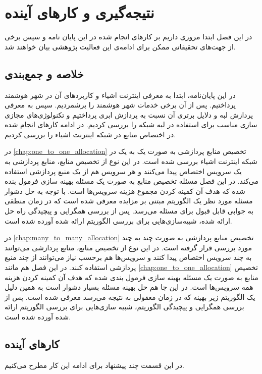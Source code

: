 \chapter{نتیجه‌گیری و کار‌های آینده}\label{chap:conclusion}
  در این فصل ابتدا مروری داریم بر کار‌های انجام شده در این پایان نامه و سپس برخی از جهت‌های تحقیقاتی ممکن برای ادامه‌ی این فعالیت پژوهشی بیان خواهند شد.

  \section{خلاصه و جمع‌بندی}
    در این پایان‌نامه، ابتدا به معرفی اینترنت اشیاء و کاربرد‌های آن در شهر هوشمند پرداختیم.
    پس از آن برخی خدمات شهر هوشمند را برشمردیم.
    سپس به معرفی پردازش لبه و دلایل برتری آن نسبت به پردازش ابری پرداختیم و تکنولوژی‌های مجازی سازی مناسب برای استفاده در لبه شبکه را بررسی کردیم.
    در ادامه کار‌های انجام شده در اختصاص منابع در شبکه اینترنت اشیاء را بررسی کردیم.

    در \cref{chap:one_to_one_allocation} تخصیص منابع پردازشی به صورت یک به یک در شبکه اینترنت اشیاء بررسی شده است.
    در این نوع از تخصیص منابع، منابع پردازشی به یک سرویس اختصاص پیدا می‌کنند و هر سرویس هم از یک منبع پردازشی استفاده می‌کند.
    در این فصل مسئله تخصیص منابع به صورت یک مسئله بهینه سازی فرمول بنده شده که هدف آن کمینه کردن مجموع هزینه سرویس‌ها است.
    با توجه به حل دشوار مسئله مورد نظر یک الگوریتم مبتنی بر مزایده معرفی شده است که در زمان منطقی به جوابی قابل قبول برای مسئله می‌رسد.
    پس از بررسی همگرایی و پیچیدگی راه حل ارائه شده، شبیه‌سازی‌هایی برای بررسی الگوریتم ارائه شده آورده شده است.

    در \cref{chap:many_to_many_allocation} تخصیص منابع پردازشی به صورت چند به چند مورد بررسی قرار گرفته است.
    در این نوع از تخصیص منابع، منابع پردازشی می‌توانند به چند سرویس اختصاص پیدا کنند و سرویس‌ها هم برحسب نیاز می‌توانند از چند منبع پردازشی استفاده کنند.
    در این فصل هم مانند \cref{chap:one_to_one_allocation} تخصیص منابع به صورت یک مسئله بهینه سازی فرمول بندی شده که هدف آن کمینه کردن هزینه همه سرویس‌ها است.
    در این جا هم حل بهینه مسئله بسیار دشوار است به همین دلیل یک الگوریتم زیر بهینه که در زمان معقولی به نتیجه می‌رسد معرفی شده است.
    پس از بررسی همگرایی و پیچیدگی الگوریتم، شبیه سازی‌هایی برای بررسی الگوریتم ارائه شده آورده شده است.

  \section{کار‌های آینده}
    در این قسمت چند پیشنهاد برای ادامه این کار مطرح می‌کنیم.
  
